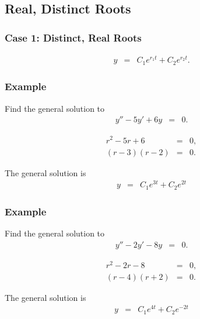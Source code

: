 \subsection{Real, Distinct Roots}

\begin{frame}
  \frametitle{Case 1: Distinct, Real Roots}

  \begin{eqnarray*}
    y & = & C_1 e^{r_1 t} + C_2 e^{r_2 t}.
  \end{eqnarray*}

\end{frame}


\begin{frame}
  \frametitle{Example}

  Find the general solution to
  \begin{eqnarray*}
    y'' - 5y' + 6y & = & 0.
  \end{eqnarray*}

  {
    \begin{eqnarray*}
      r^2 - 5r + 6 & = & 0, \\
      (r-3)(r-2) & = & 0.
    \end{eqnarray*}

    The general solution is
    \begin{eqnarray*}
      y & = & C_1 e^{3t} + C_2 e^{2t}
    \end{eqnarray*}

  }

\end{frame}


\begin{frame}
  \frametitle{Example}

  Find the general solution to
  \begin{eqnarray*}
    y'' - 2y' - 8y & = & 0.
  \end{eqnarray*}

  {
    \begin{eqnarray*}
      r^2 - 2r - 8 & = & 0, \\
      (r-4)(r+2) & = & 0.
    \end{eqnarray*}

    The general solution is
    \begin{eqnarray*}
      y & = & C_1 e^{4t} + C_2 e^{-2t}
    \end{eqnarray*}

  }

\end{frame}


